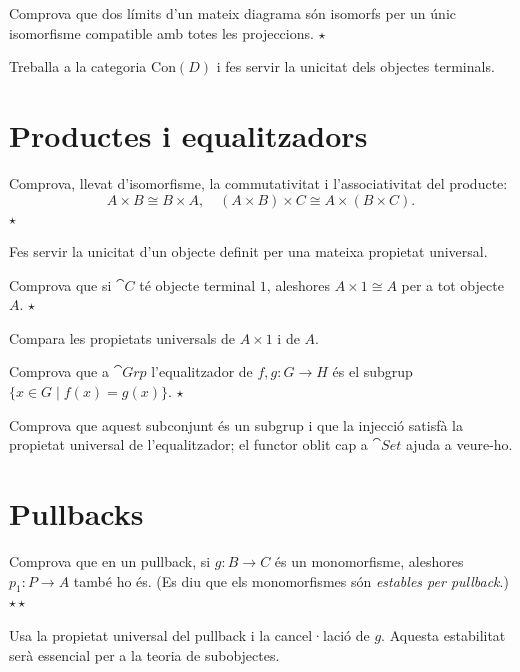 \begin{exercici}
Comprova que dos límits d'un mateix diagrama són isomorfs per un únic isomorfisme compatible amb totes les projeccions. \hfill{\normalfont$\star$}
\begin{indicacio}
Treballa a la categoria $\mathrm{Con}(D)$ i fes servir la unicitat dels objectes terminals.
\end{indicacio}
\end{exercici}

\section{Productes i equalitzadors}

\begin{exercici}
Comprova, llevat d'isomorfisme, la commutativitat i l'associativitat del producte:
\[
A\times B\cong B\times A,\quad (A\times B)\times C\cong A\times(B\times C).
\] \hfill{\normalfont$\star$}
\begin{indicacio}
Fes servir la unicitat d'un objecte definit per una mateixa propietat universal.
\end{indicacio}
\end{exercici}

\begin{exercici}
Comprova que si $\cat{C}$ té objecte terminal $1$, aleshores $A\times 1\cong A$ per a tot objecte $A$. \hfill{\normalfont$\star$}
\begin{indicacio}
Compara les propietats universals de $A\times 1$ i de $A$.
\end{indicacio}
\end{exercici}

\begin{exercici}
Comprova que a $\cat{Grp}$ l'equalitzador de $f,g\colon G\to H$ és el subgrup $\{x\in G\mid f(x)=g(x)\}$. \hfill{\normalfont$\star$}
\begin{indicacio}
Comprova que aquest subconjunt és un subgrup i que la injecció satisfà la propietat universal de l'equalitzador; el functor oblit cap a $\cat{Set}$ ajuda a veure-ho.
\end{indicacio}
\end{exercici}

\section{Pullbacks}

\begin{exercici}
Comprova que en un pullback, si $g\colon B\to C$ és un monomorfisme, aleshores $p_1\colon P\to A$ també ho és. (Es diu que els monomorfismes són \emph{estables per pullback}.) \hfill{\normalfont$\star\star$}
\begin{indicacio}
Usa la propietat universal del pullback i la cancel·lació de $g$. Aquesta estabilitat serà essencial per a la teoria de subobjectes.
\end{indicacio}
\end{exercici}

